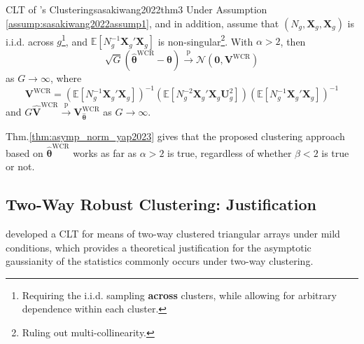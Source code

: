 \documentclass[twoside]{article}
\begin{document}
\begin{theorem}{CLT of \citet{sasaki2022non}'s Clustering}{sasakiwang2022thm3}
    Under Assumption \ref{assump:sasakiwang2022assump1}, and in addition, assume that $\left(N_g,\mathbf{X}_g,\mathbf{X}_g\right)$ is i.i.d. across $g$\footnote{Requiring the i.i.d. sampling \textbf{across} clusters, while allowing for arbitrary dependence within each cluster.}, and $\mathbb{E}\left[N^{-1}_g \mathbf{X}_g' \mathbf{X}_g\right]$ is non-singular\footnote{Ruling out multi-collinearity.}. With $\alpha>2$, then 
    $$
    \sqrt{G} \left(\hat{\boldsymbol{\theta}}^{\mathrm{WCR}} - \boldsymbol{\theta}\right) \xrightarrow{\mathrm{p}} \mathcal{N}\left(\mathbf{0},\mathbf{V}^{\mathrm{WCR}}\right)
    $$
    as $G\rightarrow \infty$, where 
    $$
    \mathbf{V}^{\mathrm{WCR}} = \left(\mathbb{E}\left[N_g^{-1}\mathbf{X}_g'\mathbf{X}_g\right]\right)^{-1} \left(\mathbb{E}\left[N_g^{-2}\mathbf{X}_g'\mathbf{X}_g \mathbf{U}_g^2\right]\right) \left(\mathbb{E}\left[N_g^{-1}\mathbf{X}_g'\mathbf{X}_g\right]\right)^{-1}
    $$
    and $G\hat{\mathbf{V}}^{\mathrm{WCR}} \xrightarrow{\mathrm{p}} \mathbf{V}^{\mathrm{WCR}}_{\hat{\boldsymbol{\theta}}}$ as $G\rightarrow \infty$.
\end{theorem}
Thm.\ref{thm:asymp_norm_yap2023} gives that the proposed clustering approach based on $\hat{\boldsymbol{\theta}}^{\mathrm{WCR}}$ works as far as $\alpha>2$ is true, regardless of whether $\beta<2$ is true or not.

\subsection{Two-Way Robust Clustering: Justification}
\citet{chiang2023using} developed a CLT for means of two-way clustered triangular arrays under mild conditions, which provides a theoretical justification for the asymptotic gaussianity of the statistics commonly occurs under two-way clustering.
\end{document}
